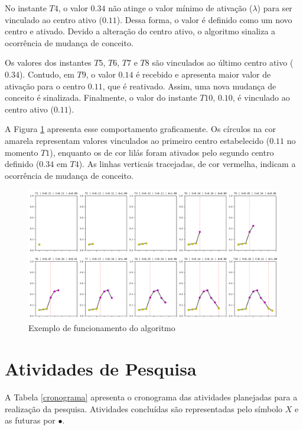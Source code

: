 \documentclass[qual, classic, a4paper]{ufbathesis}
\begin{document}
No instante $T4$, o valor $0.34$ não atinge o valor mínimo de ativação (\textit{$\lambda$}) para ser vinculado ao centro ativo ($0.11$). 
Dessa forma, o valor é definido como um novo centro e ativado.
Devido a alteração do centro ativo, o algoritmo sinaliza a ocorrência de mudança de conceito.

Os valores dos instantes $T5$, $T6$, $T7$ e $T8$ são vinculados ao último centro ativo ($0.34$). 
Contudo, em $T9$, o valor $0.14$ é recebido e apresenta maior valor de ativação para o centro $0.11$, que é reativado. 
Assim, uma nova mudança de conceito é sinalizada.
Finalmente, o valor do instante $T10$, $0.10$, é vinculado ao centro ativo ($0.11$).

A Figura \ref{fig:funcionamento_algoritmo} apresenta esse comportamento graficamente. 
Os círculos na cor amarela representam valores vinculados ao primeiro centro estabelecido ($0.11$ no momento $T1$), 
enquanto os de cor lilás foram ativados pelo segundo centro definido ($0.34$ em $T4$).
As linhas verticais tracejadas, de cor vermelha, indicam a ocorrência de mudança de conceito.

\begin{figure}[H]
\begin{center}
    \includegraphics[width=\textwidth]{imagens/funcionamento_algoritmo.png}
    \caption{Exemplo de funcionamento do algoritmo}
    \label{fig:funcionamento_algoritmo}
\end{center}
\end{figure}

\section{Atividades de Pesquisa}

A Tabela \ref{cronograma} apresenta o cronograma das atividades planejadas para a realização da pesquisa. Atividades concluídas são representadas pelo símbolo $X$ e as futuras por $\bullet$. 
\end{document}
